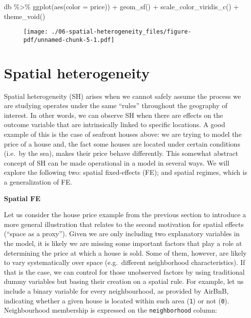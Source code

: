 \documentclass[
  letterpaper,
  krantz2]{style/krantz}
\newenvironment{Shaded}{\begin{snugshade}}{\end{snugshade}}
\newcommand{\AttributeTok}[1]{\textcolor[rgb]{0.40,0.45,0.13}{#1}}
\newcommand{\FunctionTok}[1]{\textcolor[rgb]{0.28,0.35,0.67}{#1}}
\newcommand{\NormalTok}[1]{\textcolor[rgb]{0.00,0.23,0.31}{#1}}
\newcommand{\SpecialCharTok}[1]{\textcolor[rgb]{0.37,0.37,0.37}{#1}}
\begin{document}
\begin{Shaded}
\begin{Highlighting}[]
\NormalTok{db }\SpecialCharTok{\%\textgreater{}\%}
  \FunctionTok{ggplot}\NormalTok{(}\FunctionTok{aes}\NormalTok{(}\AttributeTok{color =}\NormalTok{ price)) }\SpecialCharTok{+}
  \FunctionTok{geom\_sf}\NormalTok{() }\SpecialCharTok{+} 
  \FunctionTok{scale\_color\_viridis\_c}\NormalTok{() }\SpecialCharTok{+}
  \FunctionTok{theme\_void}\NormalTok{()}
\end{Highlighting}
\end{Shaded}

\begin{figure}[H]

{\centering \texttt{[image: ./06-spatial-heterogeneity\_files/figure-pdf/unnamed-chunk-5-1.pdf]}

}

\end{figure}

\hypertarget{spatial-heterogeneity-2}{%
\section{Spatial heterogeneity}\label{spatial-heterogeneity-2}}

Spatial heterogeneity (SH) arises when we cannot safely assume the
process we are studying operates under the same ``rules'' throughout the
geography of interest. In other words, we can observe SH when there are
effects on the outcome variable that are intrinsically linked to
specific locations. A good example of this is the case of seafront
houses above: we are trying to model the price of a house and, the fact
some houses are located under certain conditions (i.e.~by the sea),
makes their price behave differently. This somewhat abstract concept of
SH can be made operational in a model in several ways. We will explore
the following two: spatial fixed-effects (FE); and spatial regimes,
which is a generalization of FE.

\textbf{Spatial FE}

Let us consider the house price example from the previous section to
introduce a more general illustration that relates to the second
motivation for spatial effects (``space as a proxy''). Given we are only
including two explanatory variables in the model, it is likely we are
missing some important factors that play a role at determining the price
at which a house is sold. Some of them, however, are likely to vary
systematically over space (e.g.~different neighborhood characteristics).
If that is the case, we can control for those unobserved factors by
using traditional dummy variables but basing their creation on a spatial
rule. For example, let us include a binary variable for every
neighbourhood, as provided by AirBnB, indicating whether a given house
is located within such area (\texttt{1}) or not (\texttt{0}).
Neighbourhood membership is expressed on the \texttt{neighborhood}
column:
\end{document}
